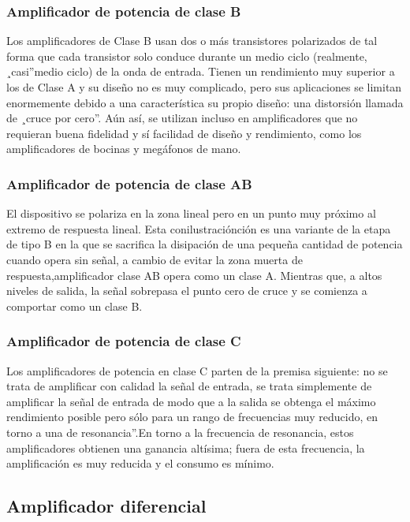 \subsubsection{Amplificador de potencia de clase B}

Los amplificadores de Clase B usan dos o más transistores polarizados de tal forma que
cada transistor solo conduce durante un medio ciclo (realmente, ¸casi”medio ciclo) de la
onda de entrada. Tienen un rendimiento muy superior a los de Clase A y su diseño no es
muy complicado, pero sus aplicaciones se limitan enormemente debido a una característica
su propio diseño: una distorsión llamada de ¸cruce por cero”. Aún así, se utilizan incluso
en amplificadores que no requieran buena fidelidad y sí facilidad de diseño y rendimiento,
como los amplificadores de bocinas y megáfonos de mano.


\subsubsection{Amplificador de potencia de clase AB}

El dispositivo se polariza en la zona lineal pero en un punto muy próximo al extremo
de respuesta lineal. Esta conilustraciónción es una variante de la etapa de tipo B en la que
se sacrifica la disipación de una pequeña cantidad de potencia cuando opera sin señal, a
cambio de evitar la zona muerta de respuesta,amplificador clase AB opera como un clase
A. Mientras que, a altos niveles de salida, la señal sobrepasa el punto cero de cruce y se
comienza a comportar como un clase B.

\subsubsection{Amplificador de potencia de clase C}

Los amplificadores de potencia en clase C parten de la premisa siguiente: no se trata
de amplificar con calidad la señal de entrada, se trata simplemente de amplificar la señal
de entrada de modo que a la salida se obtenga el máximo rendimiento posible pero sólo
para un rango de frecuencias muy reducido, en torno a una de resonancia”.En torno a la
frecuencia de resonancia, estos amplificadores obtienen una ganancia altísima; fuera de esta
frecuencia, la amplificación es muy reducida y el consumo es mínimo.

\subsection{Amplificador diferencial}

